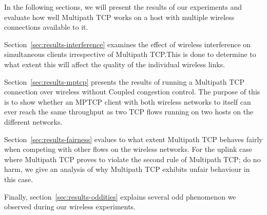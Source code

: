In the following sections, we will present the results of our experiments and
evaluate how well Multipath TCP works on a host with multiple wireless
connections available to it.

Section~\ref{sec:results-interference} examines the effect of wireless
interference on simultaneous clients irrespective of Multipath TCP.\@ This is
done to determine to what extent this will affect the quality of the individual
wireless links.

Section~\ref{sec:results-mptcp} presents the results of running a Multipath TCP
connection over wireless without Coupled congestion control. The purpose of this
is to show whether an MPTCP client with both wireless networks to itself can
ever reach the same throughput as two TCP flows running on two hosts on
the different networks.

Section~\ref{sec:results-fairness} evalues to what extent Multipath TCP behaves
fairly when competing with other flows on the wireless networks. For the uplink
case where Multipath TCP proves to violate the second rule of Multipath TCP; do
no harm, we give an analysis of why Multipath TCP exhibits unfair behaviour in
this case.

Finally, section~\ref{sec:results-oddities} explains several odd phenomenon we
observed during our wireless experiments.
